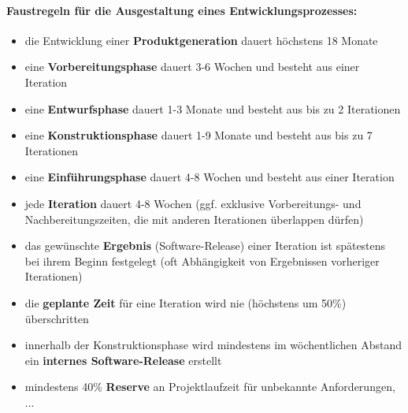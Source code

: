 \paragraph{Faustregeln für die Ausgestaltung eines Entwicklungsprozesses:}
\begin{itemize}
	\item die Entwicklung einer \textbf{Produktgeneration} dauert höchstens 18 Monate
	\item eine \textbf{Vorbereitungsphase} dauert 3-6 Wochen und besteht aus einer Iteration
	\item eine \textbf{Entwurfsphase} dauert 1-3 Monate und besteht aus bis zu 2 Iterationen
	\item  eine \textbf{Konstruktionsphase} dauert 1-9 Monate und besteht aus bis zu 7 Iterationen
	\item eine \textbf{Einführungsphase} dauert 4-8 Wochen und besteht aus einer Iteration
	\item jede \textbf{Iteration} dauert 4-8 Wochen (ggf. exklusive Vorbereitungs- und Nachbereitungszeiten, die mit anderen Iterationen überlappen dürfen)
	\item das gewünschte \textbf{Ergebnis} (Software-Release) einer Iteration ist spätestens bei ihrem Beginn festgelegt (oft Abhängigkeit von Ergebnissen vorheriger Iterationen)
	\item die \textbf{geplante Zeit} für eine Iteration wird nie (höchstens um 50\%) überschritten
	\item innerhalb der Konstruktionsphase wird mindestens im wöchentlichen Abstand ein \textbf{internes Software-Release} erstellt
	\item  mindestens 40\% \textbf{Reserve} an Projektlaufzeit für unbekannte Anforderungen, ...
\end{itemize}

